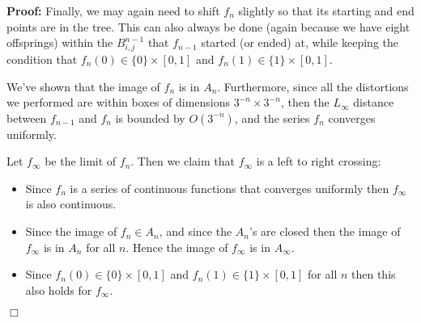 \documentclass[11pt]{article} \usepackage{amssymb}
\newenvironment{proof}{\noindent \textbf{Proof:}}{$\Box$}
\begin{document}
\begin{enumerate}
\begin{enumerate}
\begin{proof}
        Finally, we may again need to shift $f_n$ slightly so that its starting
        and end points are in the tree. This can also always be done (again
        because we have eight offsprings) within
        the $B_{i,j}^{n-1}$ that $f_{n-1}$ started (or ended) at, while keeping the condition
        that $f_n(0)\in\{0\}\times [0,1]$ and $f_n(1)\in\{1\}\times [0,1]$.
        
        We've shown that the image of $f_n$ is in $A_n$. Furthermore, 
        since all the distortions we performed are within boxes of dimensions
        $3^{-n}\times 3^{-n}$, then the $L_\infty$ distance between $f_{n-1}$ and
        $f_n$ is bounded by $O(3^{-n})$, and the series $f_n$ converges uniformly. 
        
        Let $f_\infty$ be the limit of $f_n$. Then we claim that $f_\infty$ is
        a left to right crossing:
        \begin{itemize}
        \item Since $f_n$ is a series of continuous functions that converges
          uniformly then $f_\infty$ is also continuous.
        \item Since the image of $f_n\in A_n$, and since the $A_n$'s are closed
          then the image of $f_\infty$ is in $A_n$ for all $n$. Hence the image
          of $f_\infty$ is in $A_\infty$.
        \item Since  $f_n(0)\in\{0\}\times [0,1]$ and 
          $f_n(1)\in\{1\}\times [0,1]$ for all $n$ then this also holds for
          $f_\infty$.
        \end{itemize}
        

\end{proof}
\end{enumerate}
\end{enumerate}
\end{document}
